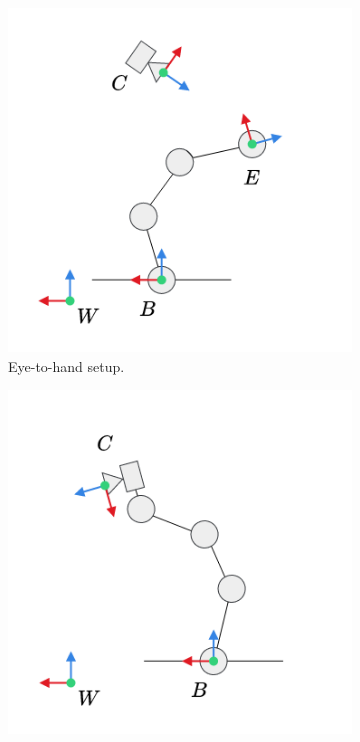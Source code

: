 \begin{figure}[tb]
    \centering
    \begin{subfigure}[b]{0.49\textwidth}
        \centering
        \includegraphics[width=\textwidth]{introduction/fig/eye_to_hand.png}
        \caption{Eye-to-hand setup.}
    \end{subfigure}
    \begin{subfigure}[b]{0.49\textwidth}
        \centering
        \includegraphics[width=\textwidth]{introduction/fig/eye_in_hand.png}

\end{subfigure}
\end{figure}
